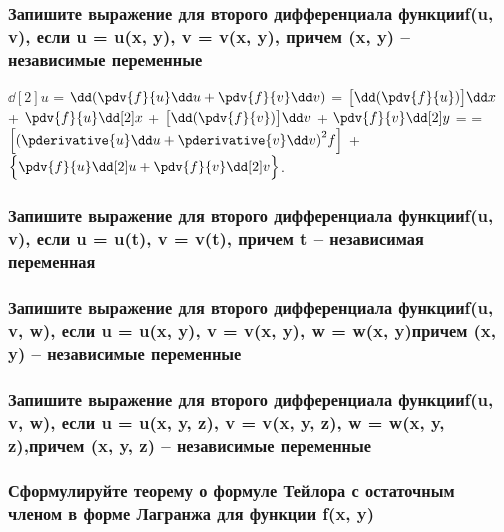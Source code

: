 \documentclass[a4paper, 12pt]{article}
\def\newline{}%
\begin{document}
            \subsubsection{Запишите выражение для второго дифференциала функции\newline f(u, v), если u = u(x, y), v = v(x, y), причем (x, y) – независимые переменные}

            $\dd[2] u$ = $\dd ( \pdv{f}{u} \dd u + \pdv{f}{v} \dd v)$ = $\bigr[\dd (\pdv{f}{u})\bigl]\dd x$ +
            $\pdv{f}{u} \dd[2] x$ + $\bigr[\dd (\pdv{f}{v}) \bigl]\dd v$ + $\pdv{f}{v} \dd[2] y$ =\newline
            = $\Bigr[ {(\pderivative{u} \dd u + \pderivative{v} \dd v)}^2f\Bigl]$ +
            $\Bigr\{ \pdv{f}{u}\dd[2] u + \pdv{f}{v}\dd[2] v \Bigl\}$.

            \subsubsection{Запишите выражение для второго дифференциала функции\newline f(u, v), если u = u(t), v = v(t), причем t – независимая переменная}



            \subsubsection{Запишите выражение для второго дифференциала функции\newline f(u, v, w), если u = u(x, y), v = v(x, y), w = w(x, y)\newline причем (x, y) – независимые переменные}



            \subsubsection{Запишите выражение для второго дифференциала функции\newline f(u, v, w), если u = u(x, y, z), v = v(x, y, z), w = w(x, y, z),\newline причем (x, y, z) – независимые переменные}



            \subsubsection{Сформулируйте теорему о формуле Тейлора с остаточным членом в форме Лагранжа для функции f(x, y)}
\end{document}
